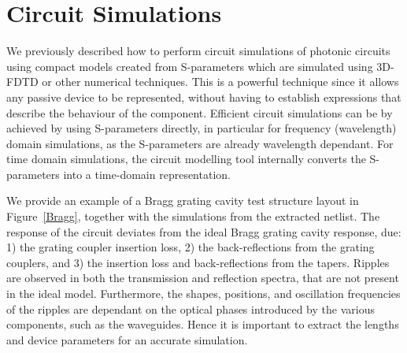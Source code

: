 \documentclass[journal]{spie}
\begin{document}
\section{Circuit Simulations}
\label{sec:circuitsim}
We previously described how to perform circuit simulations of photonic circuits using compact models created from S-parameters which are simulated using 3D-FDTD or other numerical techniques\cite{chrostowski2014design, chrostowski2015silicon}.  This is a powerful technique since it allows any passive device to be represented, without having to establish expressions that describe the behaviour of the component.  Efficient circuit simulations can be by achieved by using S-parameters directly, in particular for frequency (wavelength) domain simulations, as the S-parameters are already wavelength dependant.  For time domain simulations, the circuit modelling tool internally converts the S-parameters into a time-domain representation.  

We provide an example of a Bragg grating cavity test structure layout in Figure~\ref{Bragg}, together with the simulations from the extracted netlist.  The response of the circuit deviates from the ideal Bragg grating cavity response, due: 1) the grating coupler insertion loss, 2) the back-reflections from the grating couplers, and 3) the insertion loss and back-reflections from the tapers.  Ripples are observed in both the transmission and reflection spectra, that are not present in the ideal model.  Furthermore, the shapes,  positions, and oscillation frequencies of the ripples are dependant on the optical phases introduced by the various components, such as the waveguides.  Hence it is important to extract the lengths and device parameters for an accurate simulation.
\end{document}
